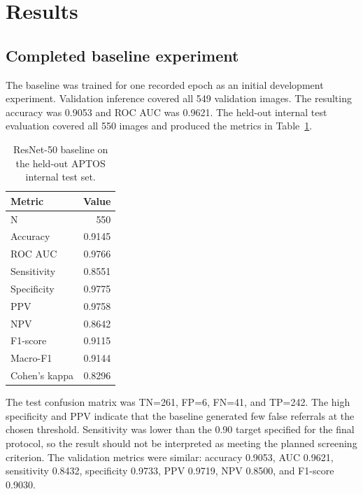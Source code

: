 \documentclass[11pt,a4paper]{article}
\begin{document}
\section{Results}
\subsection{Completed baseline experiment}
The baseline was trained for one recorded epoch as an initial development experiment. Validation inference covered all 549 validation images. The resulting accuracy was 0.9053 and ROC AUC was 0.9621. The held-out internal test evaluation covered all 550 images and produced the metrics in Table~\ref{tab:results}.

\begin{table}[H]\centering\small
\caption{ResNet-50 baseline on the held-out APTOS internal test set.}\label{tab:results}
\begin{tabular}{lr}\toprule
Metric & Value\\\midrule
N & 550\\
Accuracy & 0.9145\\
ROC AUC & 0.9766\\
Sensitivity & 0.8551\\
Specificity & 0.9775\\
PPV & 0.9758\\
NPV & 0.8642\\
F1-score & 0.9115\\
Macro-F1 & 0.9144\\
Cohen's kappa & 0.8296\\\bottomrule
\end{tabular}\end{table}

The test confusion matrix was TN=261, FP=6, FN=41, and TP=242. The high specificity and PPV indicate that the baseline generated few false referrals at the chosen threshold. Sensitivity was lower than the 0.90 target specified for the final protocol, so the result should not be interpreted as meeting the planned screening criterion. The validation metrics were similar: accuracy 0.9053, AUC 0.9621, sensitivity 0.8432, specificity 0.9733, PPV 0.9719, NPV 0.8500, and F1-score 0.9030.
\end{document}
